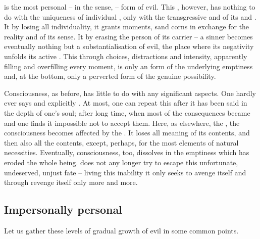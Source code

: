 \pa {} is the most personal -- in the sense,
 -- form of evil. This , however, has
nothing to do with the uniqueness of individual , only with the
transgressive and   of its  and . It
 by losing all individuality, it grants 
moments,  sand corns in exchange for the  reality and
 of its sense. It  by erasing the person of its
carrier -- a sinner becomes eventually nothing but a {substantialisation} of evil,
the place where its negativity unfolds its active . 
This  through  choices, distractions and
intensity, apparently filling and overfilling every moment, is only an
 form of the underlying emptiness and, at the bottom, only a  
perverted form of the genuine  possibility. 

Consciousness, as before, has little to do with any significant aspects.  One
hardly ever says  and explicitly .
At most, one can  repeat this after it has been said in the depth
of one's soul; after long time, when most of the consequences became
 and one finds it impossible not to accept them. Here, as elsewhere,
the , the  consciousness becomes affected by
the . It loses all meaning of its contents, and then also all the
contents, except, perhaps, for the most  elements of natural
necessities. Eventually, consciousness, too, dissolves in the emptiness which
has eroded the whole being.   does not any longer try to
escape this unfortunate, undeserved, unjust fate -- living this inability it
only seeks to avenge itself and through revenge  itself only more
and more.



\subsection{Impersonally personal}
Let us gather these levels of gradual growth of evil in some common points. 


